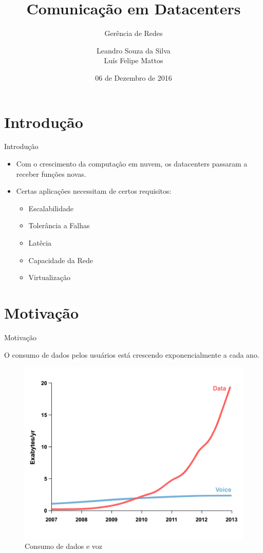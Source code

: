 \documentclass[aspectratio=169]{beamer}
\title{Comunicação em Datacenters}
\subtitle{Gerência de Redes}
\author[Leandro Silva, Luís Felipe] %
{Leandro Souza da  Silva \\ Luís Felipe Mattos}
\institute{IC - Unicamp}
\date{ 06 de Dezembro de 2016 }
\begin{document}
\frame{\titlepage}

\section{Introdução}
	\begin{frame} {Introdução}
	
		
	 \begin{itemize}
	 \setlength\itemsep{2em}
	 	\Large
	 	\item
	 		Com o crescimento da computação em nuvem, os datacenters passaram a receber funções novas.
	 		
	 \item
	  	Certas aplicações necessitam de certos requisitos:
	  	\begin{itemize}
	 		\item
	 			Escalabilidade
	 	
			\item
			 	Tolerância a Falhas
			\item
			 	Latêcia
			 	
			 \item
			 	Capacidade da Rede
			 \item
			 	Virtualização	 			
	 	\end{itemize}
	 		 	
	 \end{itemize}
		
	\end{frame}



\section{Motivação} 

	\begin{frame} {Motivação}
			
			\centering
			\Large
				 O consumo de dados pelos usuários está crescendo exponencialmente a cada ano.
				\begin{figure}[ht]    
				    \includegraphics[scale=0.3]{imagens/consumo.png}
				    \caption{Consumo de dados e voz}
				    \label{fig:sample_figure}
				\end{figure}

	\end{frame}
	
\end{document}
